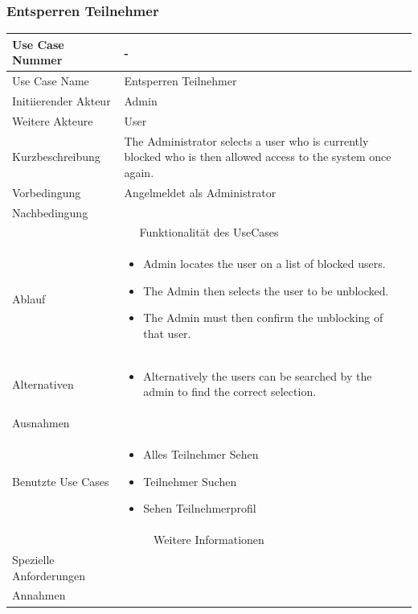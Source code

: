 \documentclass[10pt,a4paper]{article}
\begin{document}
	\subsubsection{Entsperren Teilnehmer}
	\begin{tabular}{|l|p{.5\linewidth}|}
	\hline Use Case Nummer & - \\ 
	\hline Use Case Name & Entsperren Teilnehmer \\ 
	\hline Initiierender Akteur & Admin \\
	\hline Weitere Akteure & User \\
	\hline Kurzbeschreibung & The Administrator selects a user who is currently blocked who is then allowed access to the system once again. \\
	\hline Vorbedingung & Angelmeldet als Administrator \\
	\hline Nachbedingung &  \\
	\hline \multicolumn{2}{|c|}{Funktionalität des UseCases}\\
	\hline Ablauf & \begin{itemize}
			\item Admin locates the user on a list of blocked users.
			\item The Admin then selects the user to be unblocked.
			\item The Admin must then confirm the unblocking of that user.
		\end{itemize} \\
	\hline Alternativen & \begin{itemize}
			\item Alternatively the users can be searched by the admin to find the correct selection.
		\end{itemize} \\
	\hline Ausnahmen &  \\
	\hline Benutzte Use Cases & \begin{itemize}
			\item Alles Teilnehmer Sehen
			\item Teilnehmer Suchen
			\item Sehen Teilnehmerprofil
		\end{itemize} \\
	\hline \multicolumn{2}{|c|}{Weitere Informationen} \\
	\hline Spezielle Anforderungen &  \\
	\hline Annahmen &  \\
	\hline
	\end{tabular}
	
\end{document}
